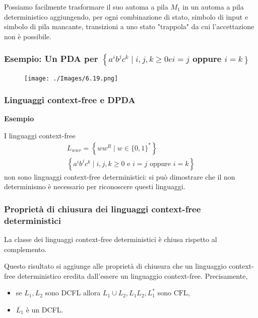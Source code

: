 \vspace{5mm}

Possiamo facilmente trasformare il suo automa a pila $M_{1}$ in un automa a pila deterministico aggiungendo, per ogni combinazione di stato, simbolo di input e simbolo di pila mancante, transizioni a uno stato "trappola" da cui l'accettazione non è possibile.

\subsubsection{Esempio: Un PDA per $\left\{a^{i} b^{j} c^{k} \mid i, j, k \geq 0 e i=j\right.$ oppure $\left.i=k\right\}$}

\begin{figure}[hbpt!]
    \centering
    \texttt{[image: ./Images/6.19.png]}
\end{figure}
\FloatBarrier

\subsubsection{Linguaggi context-free e DPDA}

\textbf{Esempio}

I linguaggi context-free
$$
\begin{gathered}
L_{w w r}=\left\{w w^{R} \mid w \in\{0,1\}^{*}\right\} \\
\left\{a^{i} b^{j} c^{k} \mid i, j, k \geq 0 \text { e } i=j \text { oppure } i=k\right\}
\end{gathered}
$$
non sono linguaggi context-free deterministici: si può dimostrare che il non determinismo è necessario per riconoscere questi linguaggi.

\subsubsection{Proprietà di chiusura dei linguaggi context-free
deterministici}

La classe dei linguaggi context-free deterministici è chiusa rispetto al complemento.

Questo risultato si aggiunge alle proprietà di chiusura che un linguaggio context-free deterministico eredita dall'essere un linguaggio context-free. Precisamente,
\begin{itemize}
    \item se $L_{1}, L_{2}$ sono DCFL allora $L_{1} \cup L_{2}, L_{1} L_{2}, L_{1}^{*}$ sono $\mathrm{CFL}$,
    \item $\overline{L_{1}}$ è un DCFL.
\end{itemize}

